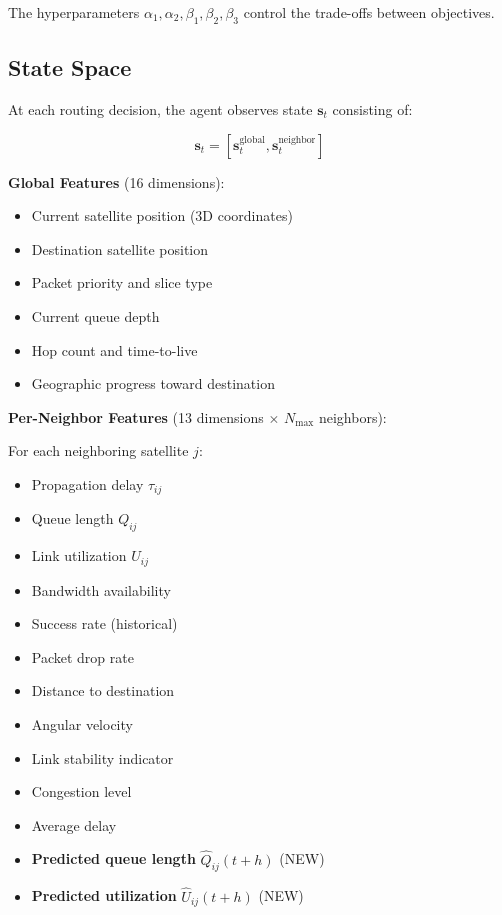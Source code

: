 The hyperparameters $\alpha_1, \alpha_2, \beta_1, \beta_2, \beta_3$ control the trade-offs between objectives.

\subsection{State Space}

At each routing decision, the agent observes state $\mathbf{s}_t$ consisting of:

\begin{equation}
\mathbf{s}_t = [\mathbf{s}_t^{\text{global}}, \mathbf{s}_t^{\text{neighbor}}]
\end{equation}

\textbf{Global Features} (16 dimensions):
\begin{itemize}
\item Current satellite position (3D coordinates)
\item Destination satellite position
\item Packet priority and slice type
\item Current queue depth
\item Hop count and time-to-live
\item Geographic progress toward destination
\end{itemize}

\textbf{Per-Neighbor Features} (13 dimensions $\times$ $N_{\max}$ neighbors):

For each neighboring satellite $j$:
\begin{itemize}
\item Propagation delay $\tau_{ij}$
\item Queue length $Q_{ij}$
\item Link utilization $U_{ij}$
\item Bandwidth availability
\item Success rate (historical)
\item Packet drop rate
\item Distance to destination
\item Angular velocity
\item Link stability indicator
\item Congestion level
\item Average delay
\item \textbf{Predicted queue length} $\hat{Q}_{ij}(t+h)$ (NEW)
\item \textbf{Predicted utilization} $\hat{U}_{ij}(t+h)$ (NEW)
\end{itemize}

